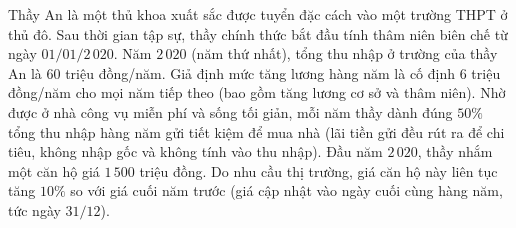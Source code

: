 \begin{ex}%
	Thầy An là một thủ khoa xuất sắc được tuyển đặc cách vào một trường THPT ở thủ đô. Sau thời gian tập sự, thầy chính thức bắt đầu tính thâm niên biên chế từ ngày $01/01/2\,020$. Năm $2\,020$ (năm thứ nhất), tổng thu nhập ở trường của thầy An là $60$ triệu đồng/năm. Giả định mức tăng lương hàng năm là cố định $6$ triệu đồng/năm cho mọi năm tiếp theo (bao gồm tăng lương cơ sở và thâm niên). Nhờ được ở nhà công vụ miễn phí và sống tối giản, mỗi năm thầy dành đúng $50\%$ tổng thu nhập hàng năm gửi tiết kiệm để mua nhà (lãi tiền gửi đều rút ra để chi tiêu, không nhập gốc và không tính vào thu nhập). Đầu năm $2\,020$, thầy nhắm một căn hộ giá $1\,500$ triệu đồng. Do nhu cầu thị trường, giá căn hộ này liên tục tăng $10\%$ so với giá cuối năm trước (giá cập nhật vào ngày cuối cùng hàng năm, tức ngày $31/12$).
	

\end{ex}
